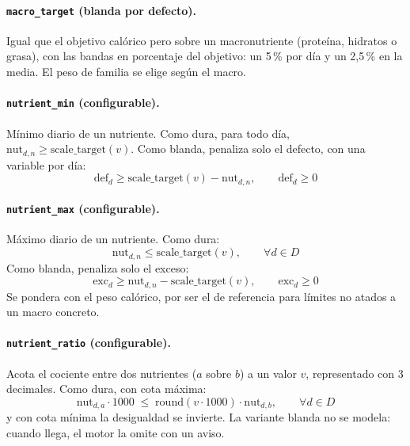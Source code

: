 \paragraph{\texttt{macro\_target} (blanda por defecto).} Igual que el objetivo calórico pero sobre un macronutriente (proteína, hidratos o grasa), con las bandas en porcentaje del objetivo: un 5\,\% por día y un 2,5\,\% en la media. El peso de familia se elige según el macro.

\paragraph{\texttt{nutrient\_min} (configurable).} Mínimo diario de un nutriente. Como dura, para todo día, $\text{nut}_{d,n} \ge \text{scale\_target}(v)$. Como blanda, penaliza solo el defecto, con una variable por día:
\begin{equation*}
\text{def}_d \ge \text{scale\_target}(v) - \text{nut}_{d,n}, \qquad \text{def}_d \ge 0
\end{equation*}

\paragraph{\texttt{nutrient\_max} (configurable).} Máximo diario de un nutriente. Como dura:
\begin{equation*}
\text{nut}_{d,n} \le \text{scale\_target}(v), \qquad \forall d \in D
\end{equation*}
Como blanda, penaliza solo el exceso:
\begin{equation*}
\text{exc}_d \ge \text{nut}_{d,n} - \text{scale\_target}(v), \qquad \text{exc}_d \ge 0
\end{equation*}
Se pondera con el peso calórico, por ser el de referencia para límites no atados a un macro concreto.

\paragraph{\texttt{nutrient\_ratio} (configurable).} Acota el cociente entre dos nutrientes ($a$ sobre $b$) a un valor $v$, representado con 3 decimales. Como dura, con cota máxima:
\begin{equation*}
\text{nut}_{d,a} \cdot 1000 \;\le\; \text{round}(v \cdot 1000) \cdot \text{nut}_{d,b}, \qquad \forall d \in D
\end{equation*}
y con cota mínima la desigualdad se invierte. La variante blanda no se modela: cuando llega, el motor la omite con un aviso.

